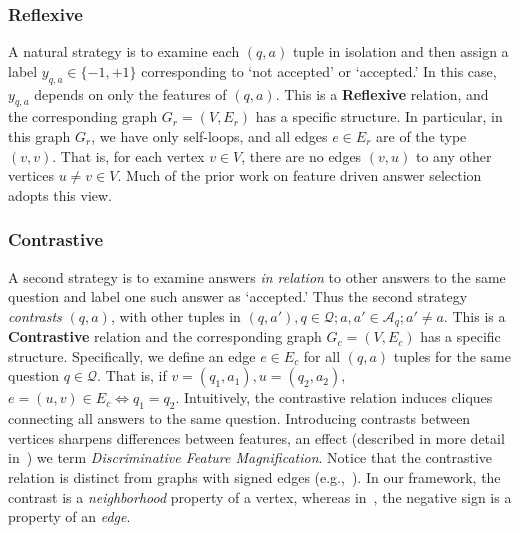 
\subsubsection{Reflexive}
\label{sub:Reflexive}

A natural strategy is to examine each $(q,a)$ tuple in isolation and then assign a label $y_{q,a} \in \{-1,+1 \}$ corresponding to `not accepted' or `accepted.' In this case, $y_{q,a}$ depends on only the features of $(q,a)$. This is a \textbf{Reflexive} relation, and the corresponding graph $G_r = (V,E_r)$ has a specific structure. In particular, in this graph $G_r$, we have only self-loops, and all edges $e \in E_r$ are of the type $(v,v)$. That is, for each vertex $v \in V$, there are no edges $(v,u)$ to any other vertices $u\neq v \in V$. Much of the prior work on feature driven answer selection~\cite{BurelMA16,JendersKN16,TianZL13,TianL16} adopts this view.

\subsubsection{Contrastive}
\label{sub:Contrastive}

A second strategy is to examine answers \textit{in relation} to other answers to the same question and label one such answer as `accepted.' Thus the second strategy \textit{contrasts} $(q,a)$, with other tuples in  $(q,a'), q \in \mathcal{Q}; a, a' \in \mathcal{A}_q; a'\neq a$. This is a \textbf{Contrastive} relation and the corresponding graph $G_c = (V,E_c)$ has a specific structure. Specifically, we define an edge $e \in E_c$ for all $(q,a)$ tuples for the same question $q \in \mathcal{Q}$. That is, if  $v = (q_1, a_1), u=(q_2, a_2)$, $e=(u, v) \in E_c \iff q_1=q_2$. Intuitively, the contrastive relation induces cliques connecting all answers to the same question. Introducing contrasts between vertices sharpens differences between features, an effect (described in more detail in~) we term \emph{Discriminative Feature Magnification}. Notice that the contrastive relation is distinct from graphs with signed edges (e.g.,~\cite{signedgcn}). In our framework, the contrast is a \textit{neighborhood} property of a vertex, whereas in~\cite{signedgcn}, the negative sign is a property of an \textit{edge}.


